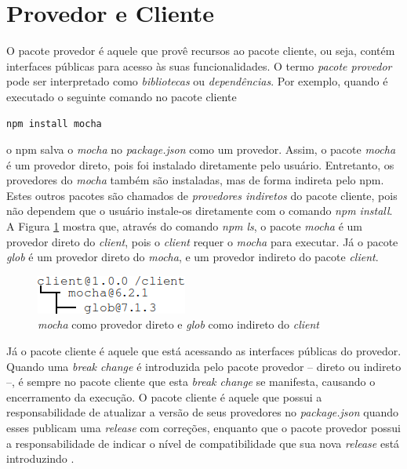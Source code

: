 \section{Provedor e Cliente}
\label{ref-teo:prov_clie}
O pacote provedor é aquele que provê recursos ao pacote cliente, ou seja, contém interfaces públicas para acesso às suas funcionalidades. O termo \textit{pacote provedor} pode ser interpretado como \textit{bibliotecas} ou \textit{dependências}. Por exemplo, quando é executado o seguinte comando no pacote cliente

\begin{lstlisting}[style=bash, label=cod:install:provider]
npm install mocha
\end{lstlisting}
o \gls{npm} salva o \textit{mocha} no \textit{package.json} como um provedor. Assim, o pacote \textit{mocha} é um provedor direto, pois foi instalado diretamente pelo usuário. Entretanto, os provedores do \textit{mocha} também são instaladas, mas de forma indireta pelo \gls{npm}. Estes outros pacotes são chamados de \textit{provedores indiretos} do pacote cliente, pois não dependem que o usuário instale-os diretamente com o comando \textit{npm install}. A Figura \ref{fig:provider} mostra que, através do comando \textit{npm ls}, o pacote \textit{mocha} é um provedor direto do \textit{client}, pois o \textit{client} requer o \textit{mocha} para executar. Já o pacote \textit{glob} é um provedor direto do \textit{mocha}, e um provedor indireto do pacote \textit{client}.

\begin{figure}
    \centering
    \includegraphics{figuras/provider_directly_undirectly.png}
    \caption{\textit{mocha} como provedor direto e \textit{glob} como indireto do \textit{client}}
    \label{fig:provider}
\end{figure}{}

Já o pacote cliente é aquele que está acessando as interfaces públicas do provedor. Quando uma \textit{break change} é introduzida pelo pacote provedor -- direto ou indireto --, é sempre no pacote cliente que esta \textit{break change} se manifesta, causando o encerramento da execução. O pacote cliente é aquele que possui a responsabilidade de atualizar a versão de seus provedores no \textit{package.json} quando esses publicam uma \textit{release} com correções, enquanto que o pacote provedor possui a responsabilidade de indicar o nível de compatibilidade que sua nova \textit{release} está introduzindo \cite{teorical_reference:semver}.

